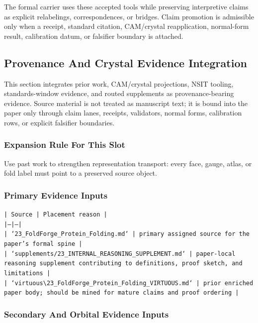 \documentclass[11pt]{article}
\begin{document}
The formal carrier uses these accepted tools while preserving interpretive
claims as explicit relabelings, correspondences, or bridges. Claim promotion is admissible only when a receipt, standard citation,
CAM/crystal reapplication, normal-form result, calibration datum, or falsifier
boundary is attached.

\subsection*{Provenance And Crystal Evidence Integration}

This section integrates prior work, CAM/crystal projections, NSIT tooling,
standards-window evidence, and routed supplements as provenance-bearing
evidence. Source material is not treated as manuscript text; it is bound into
the paper only through claim lanes, receipts, validators, normal forms,
calibration rows, or explicit falsifier boundaries.

\subsubsection*{Expansion Rule For This Slot}

Use past work to strengthen representation transport: every face, gauge, atlas, or fold label must point to a preserved source object.

\subsubsection*{Primary Evidence Inputs}

\noindent\texttt{| Source | Placement reason |}\\
\noindent\texttt{|---|---|}\\
\noindent\texttt{| `23\_FoldForge\_Protein\_Folding.md` | primary assigned source for the paper's formal spine |}\\
\noindent\texttt{| `supplements/23\_INTERNAL\_REASONING\_SUPPLEMENT.md` | paper-local reasoning supplement contributing to definitions, proof sketch, and limitations |}\\
\noindent\texttt{| `virtuous\textbackslash{}23\_FoldForge\_Protein\_Folding\_VIRTUOUS.md` | prior enriched paper body; should be mined for mature claims and proof ordering |}\\

\subsubsection*{Secondary And Orbital Evidence Inputs}
\end{document}
